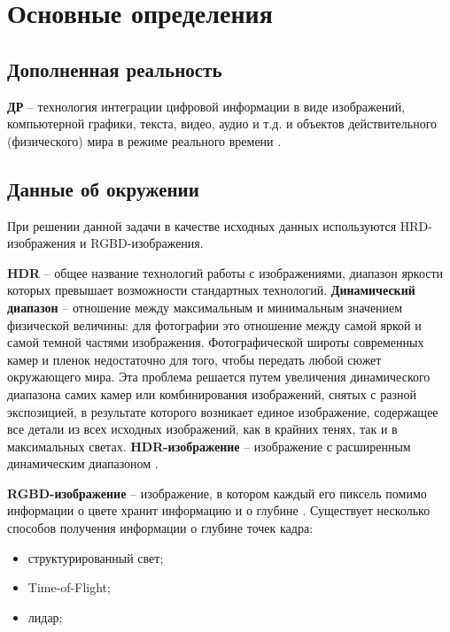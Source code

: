 \section{Основные определения}

\subsection{Дополненная реальность}

\textbf{ДР} -- технология интеграции цифровой информации в виде изображений, компьютерной графики, текста, видео, аудио и т.д. и объектов действительного (физического) мира в режиме реального времени \cite{tech-ar}.


\subsection{Данные об окружении}


При решении данной задачи в качестве исходных данных используются HRD-изображения и RGBD-изображения.

\textbf{HDR} -- общее название технологий работы с изображениями, диапазон яркости которых превышает возможности стандартных технологий. \textbf{Динамический диапазон} -- отношение между максимальным и минимальным значением физической величины: для фотографии это отношение между самой яркой и самой темной частями изображения. Фотографической широты современных камер и пленок недостаточно для того, чтобы передать любой сюжет окружающего мира. Эта проблема решается путем увеличения динамического диапазона самих камер или комбинирования изображений, снятых с разной экспозицией, в результате которого возникает единое изображение, содержащее все детали из всех исходных изображений, как в крайних тенях, так и в максимальных светах. \textbf{HDR-изображение} -- изображение с расширенным динамическим диапазоном \cite{hdri}.

\textbf{RGBD-изображение} -- изображение, в котором каждый его пиксель помимо информации о цвете хранит информацию и о глубине \cite{rgbd}. Существует несколько способов получения информации о глубине точек кадра:

\begin{itemize}
	\item структурированный свет;
	\item Time-of-Flight;
	\item лидар;
\end{itemize}

